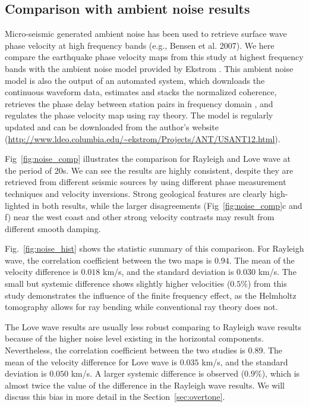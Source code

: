 \documentclass[referee]{gji}
\begin{document}
\subsection{Comparison with ambient noise results}
\label{sec:noise_comp}

Micro-seismic generated ambient noise has been used to retrieve surface wave phase velocity at high frequency bands (e.g., Bensen et al. 2007). We here compare the earthquake phase velocity maps from this study at highest frequency bands with the ambient noise model provided by Ekstrom . This ambient noise model is also the output of an automated system, which downloads the continuous waveform data, estimates and stacks the normalized coherence, retrieves the phase delay between station pairs in frequency domain \cite{Ekstrom:1997mg}, and regulates the phase velocity map using ray theory. The model is regularly updated and can be downloaded from the author’s website (\url{http://www.ldeo.columbia.edu/~ekstrom/Projects/ANT/USANT12.html}).

Fig~\ref{fig:noise_comp} illustrates the comparison for Rayleigh and Love wave at the period of 20s. We can see the results are highly consistent, despite they are retrieved from different seismic sources by using different phase measurement techniques and velocity inversions. Strong geological features are clearly high-lighted in both results, while the larger disagreements (Fig~\ref{fig:noise_comp}c and f) near the west coast and other strong velocity contrasts may result from different smooth damping. 

Fig.~\ref{fig:noise_hist} shows the statistic summary of this comparison. For Rayleigh wave, the correlation coefficient between the two maps is $0.94$. The mean of the velocity difference is $0.018$ km/s, and the standard deviation is $0.030$ km/s.  The small but systemic difference shows slightly higher velocities ($0.5\%$) from this study demonstrates the influence of the finite frequency effect, as the Helmholtz tomography allows for ray bending while conventional ray theory does not. 

The Love wave results are usually less robust comparing to Rayleigh wave results because of the higher noise level existing in the horizontal components. Nevertheless, the correlation coefficient between the two studies is 0.89. The mean of the velocity difference for Love wave is $0.035$ km/s, and the standard deviation is $0.050$ km/s. A larger systemic difference is observed ($0.9\%$), which is almost twice the value of the difference in the Rayleigh wave results. We will discuss this bias in more detail in the Section~\ref{sec:overtone}.
\end{document}

